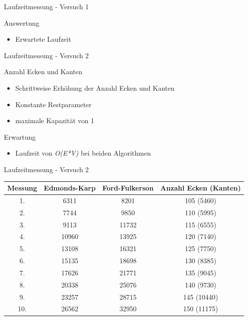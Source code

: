 \documentclass{beamer}
\begin{document}
    \begin{frame}{Laufzeitmessung - Versuch 1}
        \begin{block}{Auswertung}
            \begin{itemize}
                \item Erwartete Laufzeit
            \end{itemize}
        \end{block}
    \end{frame}

    \begin{frame}{Laufzeitmessung - Versuch 2}
        \begin{block}{Anzahl Ecken und Kanten}
            \begin{itemize}
                \item Schrittweise Erh\"ohung der Anzahl Ecken und Kanten
                \item Konstante Restparameter
                \item maximale Kapazit\"at von 1
            \end{itemize}
        \end{block}

        \begin{block}{Erwartung}
            \begin{itemize}
                \item Laufzeit von \textit{O(E*V)} bei beiden Algorithmen
            \end{itemize}
        \end{block}
    \end{frame}

    \begin{frame}{Laufzeitmessung - Versuch 2}
        \begin{center}
            \begin{tabular}{c|c|c|c}
                Messung & \textbf{Edmonds-Karp} & \textbf{Ford-Fulkerson} & Anzahl Ecken (Kanten)\\
                \hline
                1. & 6311 & 8201 & 105 (5460)\\
                2. & 7744 & 9850 & 110 (5995)\\
                3. & 9113 & 11732 & 115 (6555)\\
                4. & 10960 & 13925 & 120 (7140)\\
                5. & 13108 & 16321 & 125 (7750)\\
                6. & 15135 & 18698 & 130 (8385)\\
                7. & 17626 & 21771 & 135 (9045)\\
                8. & 20338 & 25076 & 140 (9730)\\
                9. & 23257 & 28715 & 145 (10440)\\
                10. & 26562 & 32950 & 150 (11175)\\
            \end{tabular}
        \end{center}
    \end{frame}
\end{document}
